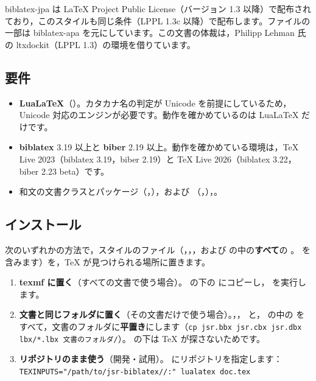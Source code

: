 biblatex-jpa は LaTeX Project Public License（バージョン 1.3 以降）で配布されており，このスタイルも同じ条件（LPPL 1.3c 以降）で配布します。ファイルの一部は biblatex-apa を元にしています。この文書の体裁は，Philipp Lehman 氏の ltxdockit（LPPL 1.3）の環境を借りています。

\subsection{要件}
\begin{itemize}
\item \textbf{LuaLaTeX}（）。カタカナ名の判定が Unicode を前提にしているため，Unicode 対応のエンジンが必要です。動作を確かめているのは LuaLaTeX だけです。
\item \textbf{biblatex} 3.19 以上と \textbf{biber} 2.19 以上。動作を確かめている環境は，TeX Live 2023（biblatex 3.19，biber 2.19）と TeX Live 2026（biblatex 3.22，biber 2.23 beta）です。
\item 和文の文書クラスとパッケージ（，），および （，），。
\end{itemize}

\subsection{インストール}
次のいずれかの方法で，スタイルのファイル（，，，および  の中の\textbf{すべて}の 。 を含みます）を，TeX が見つけられる場所に置きます。

\begin{enumerate}
\item \textbf{texmf に置く}（すべての文書で使う場合）。 の下の  にコピーし， を実行します。
\item \textbf{文書と同じフォルダに置く}（その文書だけで使う場合）。，， と， の中の  をすべて，文書のフォルダに\textbf{平置き}にします（\texttt{cp jsr.bbx jsr.cbx jsr.dbx lbx/*.lbx 文書のフォルダ/}）。 の下は TeX が探さないためです。
\item \textbf{リポジトリのまま使う}（開発・試用）。\file{TEXINPUTS} にリポジトリを指定します：\texttt{TEXINPUTS="/path/to/jsr-biblatex//:" lualatex doc.tex}
\end{enumerate}

